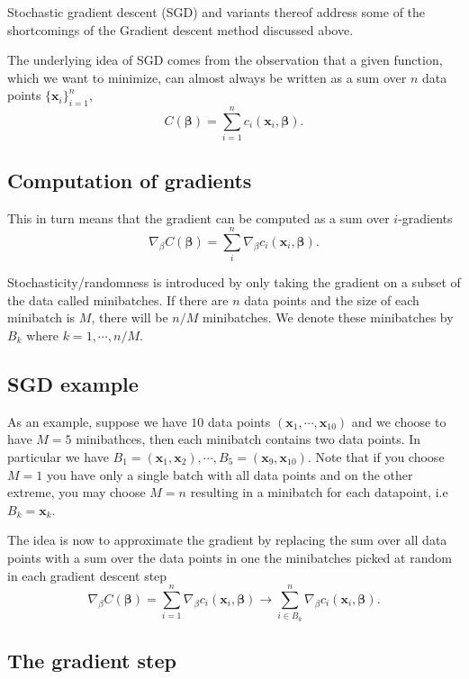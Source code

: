 \documentclass[%
oneside,                 %
final,                   %
10pt]{article}
\begin{document}
Stochastic gradient descent (SGD) and variants thereof address some of
the shortcomings of the Gradient descent method discussed above.

The underlying idea of SGD comes from the observation that a given 
function, which we want to minimize, can almost always be written as a
sum over $n$ data points $\{\mathbf{x}_i\}_{i=1}^n$,
\[
C(\mathbf{\beta}) = \sum_{i=1}^n c_i(\mathbf{x}_i,
\mathbf{\beta}). 
\]

\subsection*{Computation of gradients}

This in turn means that the gradient can be
computed as a sum over $i$-gradients 
\[
\nabla_\beta C(\mathbf{\beta}) = \sum_i^n \nabla_\beta c_i(\mathbf{x}_i,
\mathbf{\beta}).
\]

Stochasticity/randomness is introduced by only taking the
gradient on a subset of the data called minibatches.  If there are $n$
data points and the size of each minibatch is $M$, there will be $n/M$
minibatches. We denote these minibatches by $B_k$ where
$k=1,\cdots,n/M$.

\subsection*{SGD example}
As an example, suppose we have $10$ data points $(\mathbf{x}_1,\cdots, \mathbf{x}_{10})$ 
and we choose to have $M=5$ minibathces,
then each minibatch contains two data points. In particular we have
$B_1 = (\mathbf{x}_1,\mathbf{x}_2), \cdots, B_5 =
(\mathbf{x}_9,\mathbf{x}_{10})$. Note that if you choose $M=1$ you
have only a single batch with all data points and on the other extreme,
you may choose $M=n$ resulting in a minibatch for each datapoint, i.e
$B_k = \mathbf{x}_k$.

The idea is now to approximate the gradient by replacing the sum over
all data points with a sum over the data points in one the minibatches
picked at random in each gradient descent step 
\[
\nabla_{\beta}
C(\mathbf{\beta}) = \sum_{i=1}^n \nabla_\beta c_i(\mathbf{x}_i,
\mathbf{\beta}) \rightarrow \sum_{i \in B_k}^n \nabla_\beta
c_i(\mathbf{x}_i, \mathbf{\beta}).
\]

\subsection*{The gradient step}
\end{document}
